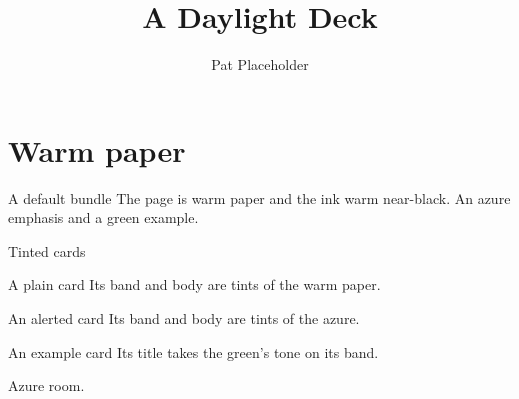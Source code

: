 \documentclass[aspectratio=169]{beamer}
\title{A Daylight Deck}
\author{Pat Placeholder}
\begin{document}
\maketitle

\section{Warm paper}

\begin{frame}{A default bundle}
  The page is warm paper and the ink warm near-black.
  An \alert{azure emphasis} and a \textcolor{example}{green example}.
\end{frame}

\begin{frame}{Tinted cards}
  \begin{block}{A plain card}
    Its band and body are tints of the warm paper.
  \end{block}
  \begin{alertblock}{An alerted card}
    Its band and body are tints of the azure.
  \end{alertblock}
  \begin{exampleblock}{An example card}
    Its title takes the green's tone on its band.
  \end{exampleblock}
\end{frame}

\begin{frame}[standout]
  Azure room.
\end{frame}
\end{document}
